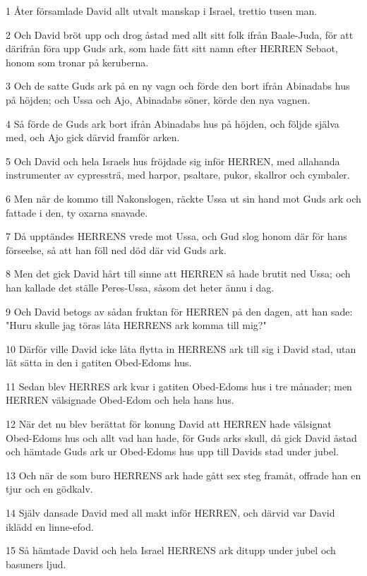 \par 1 Åter församlade David allt utvalt manskap i Israel, trettio tusen man.
\par 2 Och David bröt upp och drog åstad med allt sitt folk ifrån Baale-Juda, för att därifrån föra upp Guds ark, som hade fått sitt namn efter HERREN Sebaot, honom som tronar på keruberna.
\par 3 Och de satte Guds ark på en ny vagn och förde den bort ifrån Abinadabs hus på höjden; och Ussa och Ajo, Abinadabs söner, körde den nya vagnen.
\par 4 Så förde de Guds ark bort ifrån Abinadabs hus på höjden, och följde själva med, och Ajo gick därvid framför arken.
\par 5 Och David och hela Israels hus fröjdade sig inför HERREN, med allahanda instrumenter av cypressträ, med harpor, psaltare, pukor, skallror och cymbaler.
\par 6 Men när de kommo till Nakonslogen, räckte Ussa ut sin hand mot Guds ark och fattade i den, ty oxarna snavade.
\par 7 Då upptändes HERRENS vrede mot Ussa, och Gud slog honom där för hans förseelse, så att han föll ned död där vid Guds ark.
\par 8 Men det gick David hårt till sinne att HERREN så hade brutit ned Ussa; och han kallade det ställe Peres-Ussa, såsom det heter ännu i dag.
\par 9 Och David betogs av sådan fruktan för HERREN på den dagen, att han sade: "Huru skulle jag töras låta HERRENS ark komma till mig?"
\par 10 Därför ville David icke låta flytta in HERRENS ark till sig i David stad, utan lät sätta in den i gatiten Obed-Edoms hus.
\par 11 Sedan blev HERRES ark kvar i gatiten Obed-Edoms hus i tre månader; men HERREN välsignade Obed-Edom och hela hans hus.
\par 12 När det nu blev berättat för konung David att HERREN hade välsignat Obed-Edoms hus och allt vad han hade, för Guds arks skull, då gick David åstad och hämtade Guds ark ur Obed-Edoms hus upp till Davids stad under jubel.
\par 13 Och när de som buro HERRENS ark hade gått sex steg framåt, offrade han en tjur och en gödkalv.
\par 14 Själv dansade David med all makt inför HERREN, och därvid var David iklädd en linne-efod.
\par 15 Så hämtade David och hela Israel HERRENS ark ditupp under jubel och basuners ljud.

